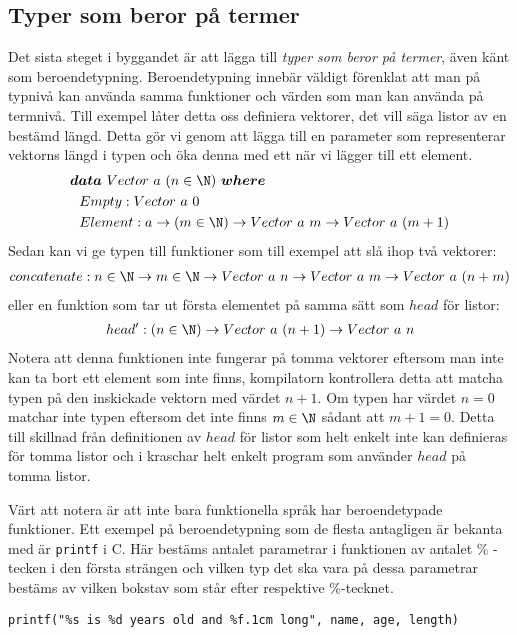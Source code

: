 \subsection{Typer som beror på termer}
Det sista steget i byggandet är att lägga till \emph{typer som beror på
termer}, även känt som beroendetypning. Beroendetypning innebär väldigt
förenklat att man på typnivå kan använda samma funktioner och värden som man
kan använda på termnivå. Till exempel låter detta oss definiera vektorer, det
vill säga listor av en bestämd längd. Detta gör vi genom att lägga till en
parameter som representerar vektorns längd i typen och öka denna med ett när vi
lägger till ett element.
\begin{align*}
  &\boldsymbol{data}\ Vector\ a\ (n \in \N)\ \boldsymbol{where} \\
  &\ \ Empty : Vector\ a\ 0 \\
  &\ \ Element : a \to (m \in \N) \to Vector\ a\ m \to Vector\ a\ (m+1)
\end{align*}
Sedan kan vi ge typen till funktioner som till exempel att slå ihop två
vektorer:
\begin{align*}
  concatenate : n \in \N \to m \in \N \to Vector\ a\ n \to Vector\ a\ m \to Vector\ a\ (n+m)
\end{align*}
eller en funktion som tar ut första elementet på samma sätt som $head$ för
listor:
\begin{align*}
  head' : (n \in \N) \to Vector\ a\ (n+1) \to Vector\ a\ n
\end{align*}
Notera att denna funktionen inte fungerar på tomma vektorer eftersom man inte
kan ta bort ett element som inte finns, kompilatorn kontrollera detta att
matcha typen på den inskickade vektorn med värdet $n+1$. Om typen har värdet $n
= 0$ matchar inte typen eftersom det inte finns $m \in \N$ sådant att $m+1 =
0$. Detta till skillnad från definitionen av $head$ för listor som helt enkelt
inte kan definieras för tomma listor och i \haskell{} kraschar helt enkelt
program som använder $head$ på tomma listor.

Värt att notera är att inte bara funktionella språk har beroendetypade
funktioner. Ett exempel på beroendetypning som de flesta antagligen är bekanta
med är \texttt{printf} i \textsc{C}. Här bestäms antalet parametrar i
funktionen av antalet \% -tecken i den första strängen och vilken typ det ska
vara på dessa parametrar bestäms av vilken bokstav som står efter respektive
\%-tecknet.
\begin{verbatim}
printf("%s is %d years old and %f.1cm long", name, age, length)
\end{verbatim}

